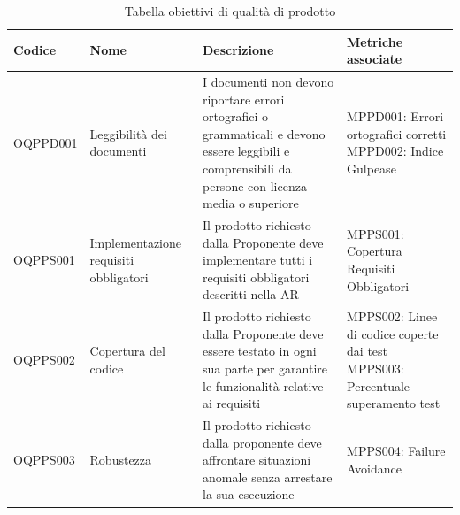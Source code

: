 \documentclass[openany,12pt,a4paper]{report}
\begin{document}
        \begin{longtable}{| p{2cm} | p{3.5cm} |p{5.5cm} | p{5.5cm} |}
        	\caption {Tabella obiettivi di qualità di prodotto} \label{tab:title} \\
        	\hline
        	\textbf{Codice} & \textbf{Nome} & \textbf{Descrizione} & \textbf{Metriche associate}\\
        	\hline
        	\endhead
        	
        	\newline OQPPD001 &
        	\newline Leggibilità dei documenti &
        	\newline I documenti non devono riportare errori ortografici o grammaticali e devono essere leggibili e comprensibili da persone con licenza media o superiore \newline &
        	\newline MPPD001: Errori ortografici corretti
        	\newline MPPD002: Indice Gulpease
        	\\[1em]
        	
        	\hline
        	
        	\newline OQPPS001 &
        	\newline Implementazione requisiti obbligatori &
        	\newline Il prodotto richiesto dalla Proponente deve implementare tutti i requisiti obbligatori descritti nella AR \newline &
        	\newline MPPS001: Copertura Requisiti Obbligatori
        	\\[1em]
        	
        	\hline
        	\newline OQPPS002 &
        	\newline Copertura del codice &
        	\newline Il prodotto richiesto dalla Proponente deve essere testato in ogni sua parte per garantire le funzionalità relative ai requisiti \newline &
        	\newline MPPS002: Linee di codice coperte dai test
        	\newline MPPS003: Percentuale superamento test
        	\\[1em]
        	
        	\hline
        	\newline OQPPS003 &
        	\newline Robustezza &
        	\newline Il prodotto richiesto dalla proponente deve affrontare situazioni anomale senza arrestare la sua esecuzione \newline &
        	\newline MPPS004: Failure Avoidance
        	\\[1em]
        	

\end{longtable}
\end{document}
